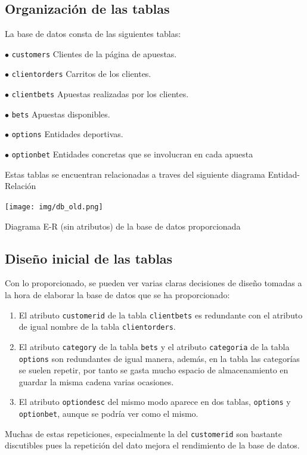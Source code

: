\documentclass{article}
\begin{document}
\subsection{Organización de las tablas}
La base de datos consta de las siguientes tablas:
\begin{ldescription}
    \item[$\bullet$ \texttt{customers}]
        Clientes de la página de apuestas.
    \item[$\bullet$ \texttt{clientorders}]
        Carritos de los clientes.
    \item[$\bullet$ \texttt{clientbets}]
        Apuestas realizadas por los clientes.
    \item[$\bullet$ \texttt{bets}]
        Apuestas disponibles.
    \item[$\bullet$ \texttt{options}]
        Entidades deportivas.
    \item[$\bullet$ \texttt{optionbet}]
        Entidades concretas que se involucran en cada apuesta
\end{ldescription}
Estas tablas se encuentran relacionadas a traves del siguiente diagrama Entidad-Relación
\smallbreak
\begin{minipage}{\linewidth}
    \centering
    \captionsetup{type=figure}
    \texttt{[image: img/db\_old.png]}
    \caption{Diagrama E-R (sin atributos) de la base de datos proporcionada}
    \label{fig:fig1}
\end{minipage}
\subsection{Diseño inicial de las tablas}
Con lo proporcionado, se pueden ver varias claras decisiones de diseño tomadas a la hora de elaborar la base de datos que se ha proporcionado:
\begin{enumerate}
    \item El atributo \texttt{customerid} de la tabla \texttt{clientbets} es redundante con el atributo de igual nombre de la tabla \texttt{clientorders}.
    \item El atributo \texttt{category} de la tabla \texttt{bets} y el atributo \texttt{categoria} de la tabla \texttt{options} son redundantes de igual manera, además, en la tabla las categorías se suelen repetir, por tanto se gasta mucho espacio de almacenamiento en guardar la misma cadena varias ocasiones.
    \item El atributo \texttt{optiondesc} del mismo modo aparece en dos tablas, \texttt{options} y \texttt{optionbet}, aunque se podría ver como el mismo.
\end{enumerate}
Muchas de estas repeticiones, especialmente la del \texttt{customerid} son bastante discutibles pues la repetición del dato mejora el rendimiento de la base de datos.
\end{document}
